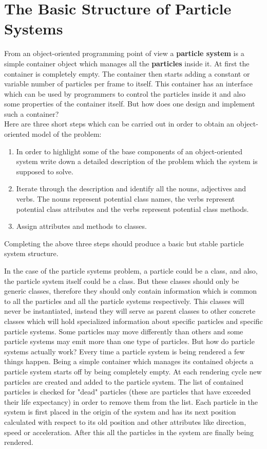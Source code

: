 \section{The Basic Structure of Particle Systems}
From an object-oriented programming point of view a \textbf{particle system} is a simple container object which manages all the \textbf{particles} inside it. At first the container is completely empty. The container then starts adding a constant or variable number of particles per frame to itself. This container has an interface which can be used by programmers to control the particles inside it and also some properties of the container itself. But how does one design and implement such a container?\\

Here are three short steps which can be carried out in order to obtain an object-oriented model of the problem:
\begin{enumerate}
	\item In order to highlight some of the base components of an object-oriented system write down a detailed description of the problem which the system is supposed to solve.
	
	\item Iterate through the description and identify all the nouns, adjectives and verbs. The nouns represent potential class names, the verbs represent potential class attributes and the verbs represent potential class methods.
	
	\item Assign attributes and methods to classes.
\end{enumerate}

Completing the above three steps should produce a basic but stable particle system structure.

\newpage
In the case of the particle systems problem, a particle could be a class, and also, the particle system itself could be a class. But these classes should only be generic classes, therefore they should only contain information which is common to all the particles and all the particle systems respectively. This classes will never be instantiated, instead they will serve as parent classes to other concrete classes which will hold specialized information about specific particles and specific particle systems. Some particles may move differently than others and some particle systems may emit more than one type of particles. But how do particle systems actually work? Every time a particle system is being rendered a few things happen. Being a simple container which manages its contained objects a particle system starts off by being completely empty. At each rendering cycle new particles are created and added to the particle system. The list of contained particles is checked for "dead" particles (these are particles that have exceeded their life expectancy) in order to remove them from the list. Each particle in the system is first placed in the origin of the system and has its next position calculated with respect to its old position and other attributes like direction, speed or acceleration. After this all the particles in the system are finally being rendered.\\

